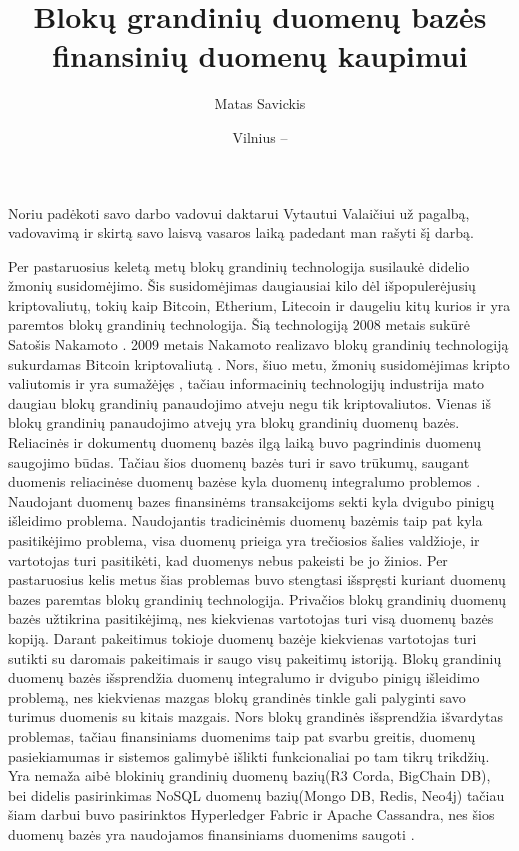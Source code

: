 \documentclass{VUMIFPSkursinis}
\title{Blokų grandinių duomenų bazės finansinių duomenų kaupimui}
\author{Matas Savickis}
\date{Vilnius – \the\year}
\begin{document}
\maketitle
\thispagestyle{empty} 

\tableofcontents

Noriu padėkoti savo darbo vadovui daktarui Vytautui Valaičiui už pagalbą, vadovavimą ir skirtą savo laisvą vasaros laiką padedant man rašyti šį darbą.
\pagebreak

\setcounter{page}{1}
\thispagestyle{empty} 
Per pastaruosius keletą metų blokų grandinių technologija susilaukė didelio žmonių susidomėjimo. 
Šis susidomėjimas daugiausiai kilo dėl išpopulerėjusių kriptovaliutų, tokių kaip Bitcoin, Etherium, Litecoin ir daugeliu kitų 
kurios ir yra paremtos blokų grandinių technologija. Šią technologiją 2008 metais sukūrė Satošis Nakamoto \cite{BlockChain}. 
2009 metais Nakamoto realizavo blokų grandinių technologiją sukurdamas Bitcoin kriptovaliutą \cite{Bitcoin}. 
Nors, šiuo metu, žmonių susidomėjimas kripto valiutomis ir yra sumažėjęs \cite{Trends}, tačiau informacinių technologijų industrija 
mato daugiau blokų grandinių panaudojimo atveju negu tik kriptovaliutos. Vienas iš blokų grandinių panaudojimo atvejų yra 
blokų grandinių duomenų bazės. Reliacinės ir dokumentų duomenų bazės ilgą laiką buvo pagrindinis duomenų saugojimo būdas. 
Tačiau šios duomenų bazės turi ir savo trūkumų, saugant duomenis reliacinėse duomenų bazėse kyla duomenų integralumo problemos \cite{Integrity}. Naudojant duomenų bazes finansinėms transakcijoms sekti kyla dvigubo pinigų išleidimo problema\cite{Double}. Naudojantis tradicinėmis duomenų bazėmis 
taip pat kyla pasitikėjimo problema, visa duomenų prieiga yra trečiosios šalies valdžioje, ir vartotojas turi pasitikėti, kad duomenys nebus pakeisti be jo žinios.
Per pastaruosius kelis metus šias problemas
buvo stengtasi išspręsti kuriant duomenų bazes paremtas blokų grandinių technologija. Privačios blokų grandinių duomenų bazės užtikrina pasitikėjimą, nes kiekvienas vartotojas turi visą duomenų 
bazės kopiją. Darant pakeitimus tokioje duomenų bazėje kiekvienas vartotojas turi sutikti su daromais pakeitimais ir saugo visų pakeitimų istoriją. Blokų grandinių duomenų bazės išsprendžia duomenų integralumo ir
dvigubo pinigų išleidimo problemą, nes kiekvienas mazgas blokų grandinės tinkle gali palyginti savo turimus duomenis su kitais mazgais. 
Nors blokų grandinės išsprendžia išvardytas problemas, tačiau finansiniams duomenims taip pat svarbu greitis, duomenų pasiekiamumas ir sistemos galimybė išlikti funkcionaliai po tam tikrų trikdžių. 
Yra nemaža aibė blokinių grandinių duomenų bazių(R3 Corda, BigChain DB), bei didelis pasirinkimas NoSQL duomenų bazių(Mongo DB, Redis, Neo4j) tačiau šiam darbui buvo pasirinktos
Hyperledger Fabric ir Apache Cassandra, nes šios duomenų bazės yra naudojamos finansiniams duomenims saugoti \cite{BnkH,BnkC}.
\end{document}
